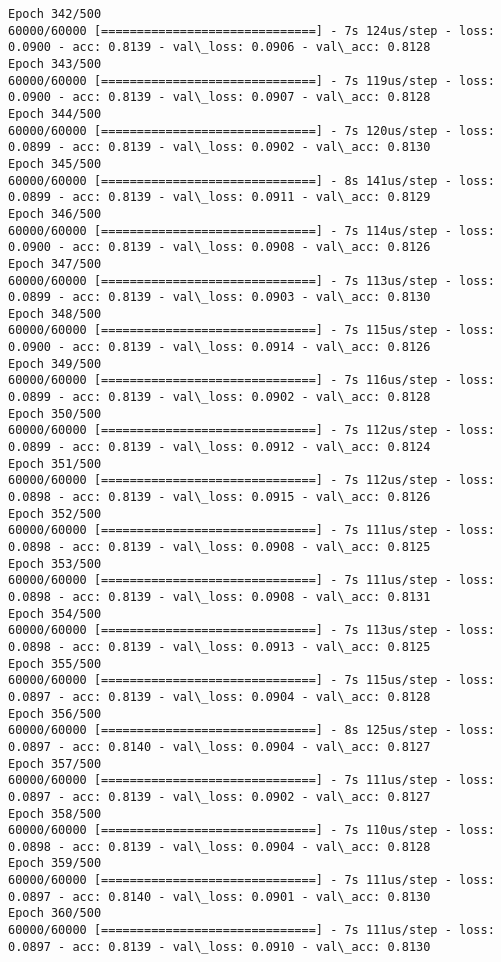 \documentclass[11pt]{article}
\begin{document}
\begin{Verbatim}[commandchars=\\\{\}]
Epoch 342/500
60000/60000 [==============================] - 7s 124us/step - loss: 0.0900 - acc: 0.8139 - val\_loss: 0.0906 - val\_acc: 0.8128
Epoch 343/500
60000/60000 [==============================] - 7s 119us/step - loss: 0.0900 - acc: 0.8139 - val\_loss: 0.0907 - val\_acc: 0.8128
Epoch 344/500
60000/60000 [==============================] - 7s 120us/step - loss: 0.0899 - acc: 0.8139 - val\_loss: 0.0902 - val\_acc: 0.8130
Epoch 345/500
60000/60000 [==============================] - 8s 141us/step - loss: 0.0899 - acc: 0.8139 - val\_loss: 0.0911 - val\_acc: 0.8129
Epoch 346/500
60000/60000 [==============================] - 7s 114us/step - loss: 0.0900 - acc: 0.8139 - val\_loss: 0.0908 - val\_acc: 0.8126
Epoch 347/500
60000/60000 [==============================] - 7s 113us/step - loss: 0.0899 - acc: 0.8139 - val\_loss: 0.0903 - val\_acc: 0.8130
Epoch 348/500
60000/60000 [==============================] - 7s 115us/step - loss: 0.0900 - acc: 0.8139 - val\_loss: 0.0914 - val\_acc: 0.8126
Epoch 349/500
60000/60000 [==============================] - 7s 116us/step - loss: 0.0899 - acc: 0.8139 - val\_loss: 0.0902 - val\_acc: 0.8128
Epoch 350/500
60000/60000 [==============================] - 7s 112us/step - loss: 0.0899 - acc: 0.8139 - val\_loss: 0.0912 - val\_acc: 0.8124
Epoch 351/500
60000/60000 [==============================] - 7s 112us/step - loss: 0.0898 - acc: 0.8139 - val\_loss: 0.0915 - val\_acc: 0.8126
Epoch 352/500
60000/60000 [==============================] - 7s 111us/step - loss: 0.0898 - acc: 0.8139 - val\_loss: 0.0908 - val\_acc: 0.8125
Epoch 353/500
60000/60000 [==============================] - 7s 111us/step - loss: 0.0898 - acc: 0.8139 - val\_loss: 0.0908 - val\_acc: 0.8131
Epoch 354/500
60000/60000 [==============================] - 7s 113us/step - loss: 0.0898 - acc: 0.8139 - val\_loss: 0.0913 - val\_acc: 0.8125
Epoch 355/500
60000/60000 [==============================] - 7s 115us/step - loss: 0.0897 - acc: 0.8139 - val\_loss: 0.0904 - val\_acc: 0.8128
Epoch 356/500
60000/60000 [==============================] - 8s 125us/step - loss: 0.0897 - acc: 0.8140 - val\_loss: 0.0904 - val\_acc: 0.8127
Epoch 357/500
60000/60000 [==============================] - 7s 111us/step - loss: 0.0897 - acc: 0.8139 - val\_loss: 0.0902 - val\_acc: 0.8127
Epoch 358/500
60000/60000 [==============================] - 7s 110us/step - loss: 0.0898 - acc: 0.8139 - val\_loss: 0.0904 - val\_acc: 0.8128
Epoch 359/500
60000/60000 [==============================] - 7s 111us/step - loss: 0.0897 - acc: 0.8140 - val\_loss: 0.0901 - val\_acc: 0.8130
Epoch 360/500
60000/60000 [==============================] - 7s 111us/step - loss: 0.0897 - acc: 0.8139 - val\_loss: 0.0910 - val\_acc: 0.8130

\end{Verbatim}
\end{document}
